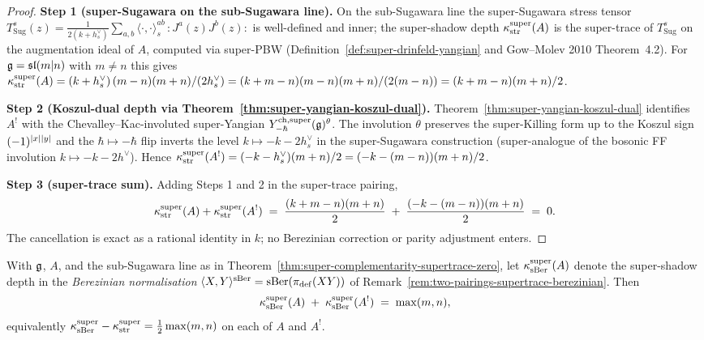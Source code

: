\begin{proof}
\textbf{Step 1 (super-Sugawara on the sub-Sugawara line).} On the
sub-Sugawara line the super-Sugawara stress tensor
$T_{\mathrm{Sug}}^{s}(z) = \frac{1}{2(k+h^{\vee}_{s})}
\sum_{a,b}\langle\cdot,\cdot\rangle_{s}^{ab}\,
{:}J^{a}(z) J^{b}(z){:}$ is well-defined and inner; the super-shadow
depth $\kappa^{\mathrm{super}}_{\operatorname{str}}(A)$ is the super-trace of
$T_{\mathrm{Sug}}^{s}$ on the augmentation ideal of $A$, computed via
super-PBW (Definition~\ref{def:super-drinfeld-yangian} and Gow--Molev
2010 Theorem~4.2). For $\mathfrak{g} = \mathfrak{sl}(m|n)$ with $m\neq n$ this gives
$\kappa^{\mathrm{super}}_{\operatorname{str}}(A)
= (k+h^{\vee}_{s})\,(m-n)(m+n)/(2 h^{\vee}_{s})
= (k+m-n)(m-n)(m+n)/(2(m-n)) = (k+m-n)(m+n)/2$.

\textbf{Step 2 (Koszul-dual depth via Theorem~\ref{thm:super-yangian-koszul-dual}).}
Theorem~\ref{thm:super-yangian-koszul-dual} identifies $A^{!}$ with the
Chevalley--Kac-involuted super-Yangian
$Y^{\mathrm{ch},\mathrm{super}}_{-\hbar}(\mathfrak{g})^{\theta}$. The involution $\theta$ preserves the
super-Killing form up to the Koszul sign
$(-1)^{|x||y|}$ and the $\hbar\mapsto -\hbar$ flip
inverts the level $k\mapsto -k - 2h^{\vee}_{s}$ in the super-Sugawara
construction (super-analogue of the bosonic FF involution
$k\mapsto -k - 2h^{\vee}$). Hence
$\kappa^{\mathrm{super}}_{\operatorname{str}}(A^{!}) = (-k - h^{\vee}_{s})(m+n)/2
= (-k - (m-n))(m+n)/2$.

\textbf{Step 3 (super-trace sum).} Adding Steps 1 and 2 in the
super-trace pairing,
\[
 \kappa^{\mathrm{super}}_{\operatorname{str}}(A) +
 \kappa^{\mathrm{super}}_{\operatorname{str}}(A^{!})
 \;=\; \frac{(k+m-n)(m+n)}{2} \;+\; \frac{(-k-(m-n))(m+n)}{2}
 \;=\; 0.
\]
The cancellation is exact as a rational identity in $k$; no Berezinian
correction or parity adjustment enters.
\end{proof}

\begin{conjecture}
\label{conj:super-complementarity-berezinian-max-mn}
\ClaimStatusConjectured
With $\mathfrak{g}$, $A$, and the sub-Sugawara line as in
Theorem~\ref{thm:super-complementarity-supertrace-zero}, let
$\kappa^{\mathrm{super}}_{\operatorname{sBer}}(A)$ denote the super-shadow depth in
the \emph{Berezinian normalisation}
$\langle X,Y\rangle^{\operatorname{sBer}}=\operatorname{sBer}(\pi_{\mathrm{def}}(XY))$ of
Remark~\ref{rem:two-pairings-supertrace-berezinian}. Then
\begin{equation}
 \label{eq:super-complementarity-berezinian}
 \kappa^{\mathrm{super}}_{\operatorname{sBer}}(A) \;+\;
 \kappa^{\mathrm{super}}_{\operatorname{sBer}}(A^{!})
 \;=\;
 \max(m,n),
\end{equation}
equivalently $\kappa^{\mathrm{super}}_{\operatorname{sBer}} -
\kappa^{\mathrm{super}}_{\operatorname{str}} = \tfrac{1}{2}\max(m,n)$ on each of
$A$ and $A^{!}$.
\end{conjecture}

